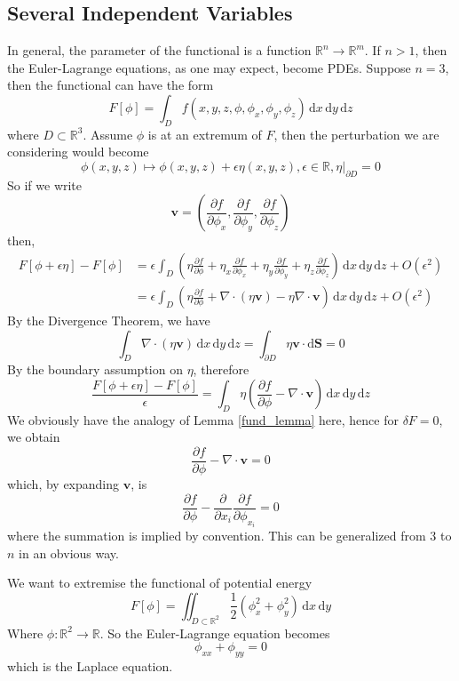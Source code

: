 \documentclass[a4paper]{article}
\begin{document}
\subsection{Several Independent Variables}
In general, the parameter of the functional is a function $\mathbb R^n\to\mathbb R^m$.
If $n>1$, then the Euler-Lagrange equations, as one may expect, become PDEs.
Suppose $n=3$, then the functional can have the form
$$F[\phi]=\int_Df(x,y,z,\phi,\phi_x,\phi_y,\phi_z)\,\mathrm dx\,\mathrm dy\,\mathrm dz$$
where $D\subset\mathbb R^3$.
Assume $\phi$ is at an extremum of $F$, then the perturbation we are considering would become
$$\phi(x,y,z)\mapsto \phi(x,y,z)+\epsilon \eta(x,y,z), \epsilon\in\mathbb R,\eta|_{\partial D}=0$$
So if we write
$$\mathbf{v}=\left( \frac{\partial f}{\partial \phi_x},\frac{\partial f}{\partial \phi_y},\frac{\partial f}{\partial\phi_z} \right)$$
then,
\begin{align*}
    F[\phi+\epsilon\eta]-F[\phi]&=\epsilon\int_D\left( \eta\frac{\partial f}{\partial\phi}+\eta_x\frac{\partial f}{\partial \phi_x}+\eta_y\frac{\partial f}{\partial \phi_y}+\eta_z\frac{\partial f}{\partial \phi_z} \right)\,\mathrm dx\,\mathrm dy\,\mathrm dz+O(\epsilon^2)\\
    &=\epsilon\int_D\left( \eta\frac{\partial f}{\partial\phi}+\nabla\cdot( \eta\mathbf{v})-\eta\nabla\cdot\mathbf{v} \right)\,\mathrm dx\,\mathrm dy\,\mathrm dz+O(\epsilon^2)
\end{align*}
By the Divergence Theorem, we have
$$\int_D\nabla\cdot(\eta\mathbf{v})\,\mathrm dx\,\mathrm dy\,\mathrm dz=\int_{\partial D}\eta\mathbf{v}\cdot\mathrm d\mathbf{S}=0$$
By the boundary assumption on $\eta$, therefore
$$\frac{F[\phi+\epsilon\eta]-F[\phi]}{\epsilon}=\int_D\eta\left( \frac{\partial f}{\partial\phi}-\nabla\cdot\mathbf{v} \right)\,\mathrm dx\,\mathrm dy\,\mathrm dz$$
We obviously have the analogy of Lemma \ref{fund_lemma} here, hence for $\delta F=0$, we obtain
$$\frac{\partial f}{\partial\phi}-\nabla\cdot\mathbf{v}=0$$
which, by expanding $\mathbf{v}$, is
$$\frac{\partial f}{\partial\phi}-\frac{\partial}{\partial x_i}\frac{\partial f}{\partial \phi_{x_i}}=0$$
where the summation is implied by convention.
This can be generalized from $3$ to $n$ in an obvious way.

\begin{example}
    We want to extremise the functional of potential energy
    $$F[\phi]=\iint_{D\subset\mathbb R^2}\frac{1}{2}(\phi_x^2+\phi_y^2)\,\mathrm dx\,\mathrm dy$$
    Where $\phi:\mathbb R^2\to\mathbb R$.
    So the Euler-Lagrange equation becomes
    $$\phi_{xx}+\phi_{yy}=0$$
    which is the Laplace equation.
\end{example}
\end{document}
